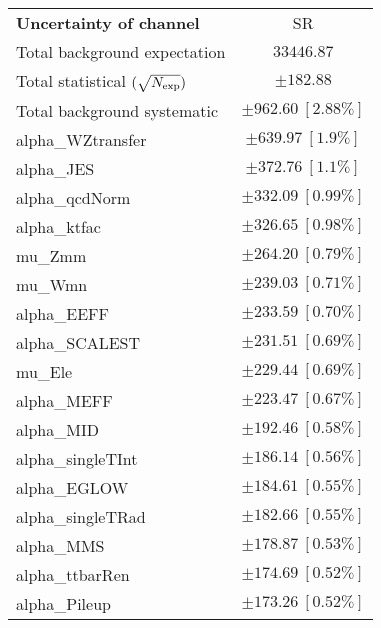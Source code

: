 
\begin{table}
\begin{center}
\setlength{\tabcolsep}{0.0pc}
\begin{tabular*}{\textwidth}{@{\extracolsep{\fill}}lc}
\noalign{\smallskip}\hline\noalign{\smallskip}
{\bf Uncertainty of channel}                                    & SR            \\
\noalign{\smallskip}\hline\noalign{\smallskip}
Total background expectation             &  $33446.87$       \\
\noalign{\smallskip}\hline\noalign{\smallskip}
Total statistical $(\sqrt{N_{\rm exp}})$              & $\pm 182.88$       \\
Total background systematic               & $\pm 962.60\ [2.88\%] $             \\
\noalign{\smallskip}\hline\noalign{\smallskip}
\noalign{\smallskip}\hline\noalign{\smallskip}
alpha\_WZtransfer         & $\pm 639.97\ [1.9\%] $       \\
alpha\_JES         & $\pm 372.76\ [1.1\%] $       \\
alpha\_qcdNorm         & $\pm 332.09\ [0.99\%] $       \\
alpha\_ktfac         & $\pm 326.65\ [0.98\%] $       \\
mu\_Zmm         & $\pm 264.20\ [0.79\%] $       \\
mu\_Wmn         & $\pm 239.03\ [0.71\%] $       \\
alpha\_EEFF         & $\pm 233.59\ [0.70\%] $       \\
alpha\_SCALEST         & $\pm 231.51\ [0.69\%] $       \\
mu\_Ele         & $\pm 229.44\ [0.69\%] $       \\
alpha\_MEFF         & $\pm 223.47\ [0.67\%] $       \\
alpha\_MID         & $\pm 192.46\ [0.58\%] $       \\
alpha\_singleTInt         & $\pm 186.14\ [0.56\%] $       \\
alpha\_EGLOW         & $\pm 184.61\ [0.55\%] $       \\
alpha\_singleTRad         & $\pm 182.66\ [0.55\%] $       \\
alpha\_MMS         & $\pm 178.87\ [0.53\%] $       \\
alpha\_ttbarRen         & $\pm 174.69\ [0.52\%] $       \\
alpha\_Pileup         & $\pm 173.26\ [0.52\%] $       \\

\end{tabular*}
\end{center}
\end{table}
